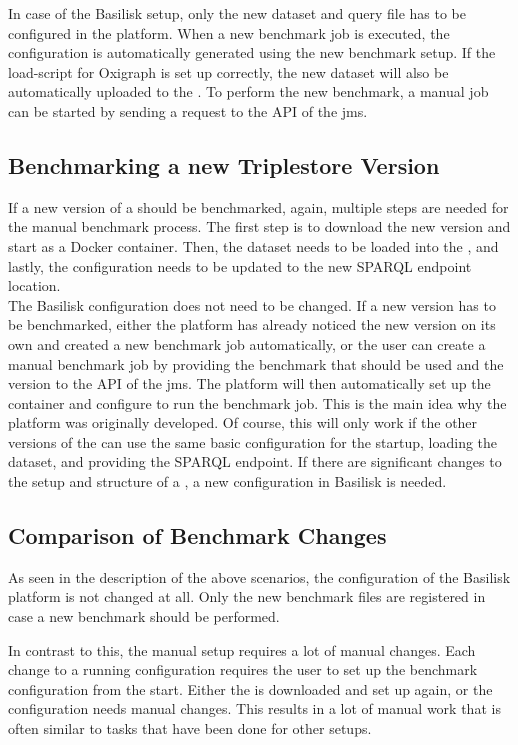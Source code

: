 In case of the Basilisk setup, only the new dataset and query file has to be configured in the platform.
When a new benchmark job is executed, the \iguana{} configuration is automatically generated using the new benchmark setup.
If the load-script for Oxigraph is set up correctly, the new dataset will also be automatically uploaded to the \ts{}.
To perform the new benchmark, a manual job can be started by sending a request to the API of the \ac{jms}.


\subsection{Benchmarking a new Triplestore Version}
If a new version of a \ts{} should be benchmarked, again, multiple steps are needed for the manual benchmark process.
The first step is to download the new version and start as a Docker container.
Then, the dataset needs to be loaded into the \ts{}, and lastly, the \iguana{} configuration needs to be updated to the new SPARQL endpoint location.
\\

The Basilisk configuration does not need to be changed.
If a new version has to be benchmarked, either the platform has already noticed the new version on its own and created a new benchmark job automatically, or the user can create a manual benchmark job by providing the benchmark that should be used and the \ts{} version to the API of the \ac{jms}.
The platform will then automatically set up the container and configure \iguana{} to run the benchmark job.
This is the main idea why the platform was originally developed.
Of course, this will only work if the other versions of the \ts{} can use the same basic configuration for the startup, loading the dataset, and providing the SPARQL endpoint.
If there are significant changes to the setup and structure of a \ts{}, a new configuration in Basilisk is needed.


\subsection{Comparison of Benchmark Changes}
As seen in the description of the above scenarios, the \ts{} configuration of the Basilisk platform is not changed at all.
Only the new benchmark files are registered in case a new benchmark should be performed.

In contrast to this, the manual setup requires a lot of manual changes.
Each change to a running configuration requires the user to set up the benchmark configuration from the start.
Either the \ts{} is downloaded and set up again, or the \iguana{} configuration needs manual changes.
This results in a lot of manual work that is often similar to tasks that have been done for other setups.


